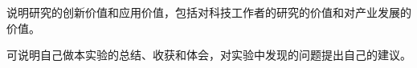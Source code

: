 \documentclass{thuemp}
\begin{document}
说明研究的创新价值和应用价值，包括对科技工作者的研究的价值和对产业发展的价值。

可说明自己做本实验的总结、收获和体会，对实验中发现的问题提出自己的建议。



\renewcommand\refname{\heiti\wuhao\centerline{参考文献}\global\def\refname{参考文献}}
\vskip 12pt



{
\renewcommand{\baselinestretch}{0.9}
\liuhao


}
\end{document}
